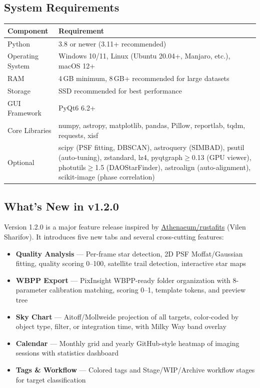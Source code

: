 \documentclass[11pt,a4paper]{article}
\begin{document}
\subsection{System Requirements}

\begin{center}
\begin{tabular}{lp{10cm}}
\toprule
\textbf{Component} & \textbf{Requirement} \\
\midrule
Python & 3.8 or newer (3.11+ recommended) \\
Operating System & Windows 10/11, Linux (Ubuntu 20.04+, Manjaro, etc.), macOS 12+ \\
RAM & 4\,GB minimum, 8\,GB+ recommended for large datasets \\
Storage & SSD recommended for best performance \\
GUI Framework & PyQt6 6.2+ \\
Core Libraries & numpy, astropy, matplotlib, pandas, Pillow, reportlab, tqdm, requests, xisf \\
Optional & scipy (PSF fitting, DBSCAN), astroquery (SIMBAD), psutil (auto-tuning), zstandard, lz4, pyqtgraph$\geq$0.13 (GPU viewer), photutils$\geq$1.5 (DAOStarFinder), astroalign (auto-alignment), scikit-image (phase correlation) \\
\bottomrule
\end{tabular}
\end{center}

\subsection{What's New in v1.2.0}

Version 1.2.0 is a major feature release inspired by \href{https://github.com/eg013ra1n/rustafits}{Athenaeum/rustafits} (Vilen Sharifov). It introduces five new tabs and several cross-cutting features:

\begin{newfeaturebox}
\begin{itemize}
    \item \textbf{Quality Analysis} --- Per-frame star detection, 2D PSF Moffat/Gaussian fitting, quality scoring 0--100, satellite trail detection, interactive star maps
    \item \textbf{WBPP Export} --- PixInsight WBPP-ready folder organization with 8-parameter calibration matching, scoring 0--1, template tokens, and preview tree
    \item \textbf{Sky Chart} --- Aitoff/Mollweide projection of all targets, color-coded by object type, filter, or integration time, with Milky Way band overlay
    \item \textbf{Calendar} --- Monthly grid and yearly GitHub-style heatmap of imaging sessions with statistics dashboard
    \item \textbf{Tags \& Workflow} --- Colored tags and Stage/WIP/Archive workflow stages for target classification
\end{itemize}
\end{newfeaturebox}
\end{document}
